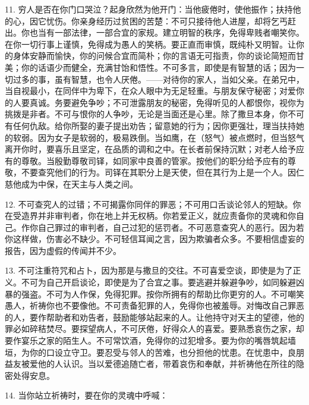 11. 穷人是否在你门口哭泣？起身欣然为他开门：当他疲倦时，使他振作；扶持他的心，因它忧伤。你亲身经历过贫困的苦楚：不可只接待他人进屋，却将乞丐赶出。你也当有一部法律，一部合宜的家规。建立明智的秩序，免得卑贱者嘲笑你。在你一切行事上谨慎，免得成为愚人的笑柄。要正直而审慎，既纯朴又明智。让你的身体安静而愉快，你的问候合宜而简朴；你的言语无可指责，你的谈论简短而甘美；你的话语少而健全，充满甘饴和悟性。不可多言，即使是有智慧的话；因为一切过多的事，虽有智慧，也令人厌倦。——对待你的家人，当如父亲。在弟兄中，当自视最小，在同伴中为卑下，在众人眼中为无足轻重。与朋友保守秘密；对爱你的人要真诚。务要避免争吵；不可泄露朋友的秘密，免得听见的人都恨你，视你为挑拨是非者。不可与恨你的人争吵，无论是当面还是心里。除了撒旦本身，你不可有任何仇敌。给你所娶的妻子提出劝告；留意她的行为；因你更强壮，理当扶持她的软弱。因为女子是软弱的，极易跌倒。当如鹰，在（怒气）被点燃时，但当怒气离开你时，要喜乐且坚定，在品质的调和之中。在长者前保持沉默；对老人给予应有的尊敬。当殷勤尊敬司铎，如同家中良善的管家。按他们的职分给予应有的尊敬，不要查究他们的行为。司铎在其职分上是天使，但在其行为上是一个人。因仁慈他成为中保，在天主与人类之间。\newline{}\par

12. 不可查究人的过错；不可揭露你同伴的罪恶；不可用口舌谈论邻人的短缺。你在受造界并非审判者，你在地上并无权柄。你若爱正义，就应责备你的灵魂和你自己。作你自己罪过的审判者，自己过犯的惩罚者。不可恶意查究人的恶行。因为若你这样做，伤害必不缺少。不可轻信耳闻之言，因为欺骗者众多。不要相信虚妄的报告，因为虚假的传闻并不少。\newline{}\par

13. 不可注重符咒和占卜，因为那是与撒旦的交往。不可喜爱空谈，即使是为了正义。不可为自己开启谈论，即使是为了合宜之事。要逃避并躲避争吵，如同躲避凶暴的强盗。不可为人作保，免得犯罪。按你所拥有的帮助比你更穷的人。不可嘲笑愚人，祈祷你也不要像他。不可责备犯罪的人，免得你也被羞辱。对悔改自己罪恶的人，要作帮助者和劝告者，鼓励能够站起来的人。让他持守对天主的望德，他的罪必如碎秸焚尽。要探望病人，不可厌倦，好得众人的喜爱。要熟悉哀伤之家，却要作宴乐之家的陌生人。不可常饮酒，免得你的过犯增多。要为你的嘴唇筑起墙垣，为你的口设立守卫。要忍受与邻人的苦难，也分担他的忧患。在忧患中，良朋益友被爱他的人认识。当以爱德追随亡者，带着哀伤和奉献，并祈祷他在所往的隐密处得安息。\newline{}\par

14. 当你站立祈祷时，要在你的灵魂中呼喊：\newline{}\par


